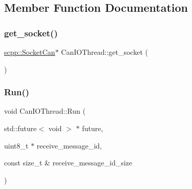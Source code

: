 \subsection{Member Function Documentation}
\mbox{\label{classCanIOThread_abd81d2bfe629d2abf8a3ee4e0d71c7e5}} 
\subsubsection{\texorpdfstring{get\+\_\+socket()}{get\_socket()}}
{\footnotesize\ttfamily \hyperlink{classscpp_1_1SocketCan}{scpp\+::\+Socket\+Can}$\ast$ Can\+I\+O\+Thread\+::get\+\_\+socket (\begin{DoxyParamCaption}{ }\end{DoxyParamCaption})}

\mbox{\label{classCanIOThread_a1dfe981584e3e558df59211571ac9860}} 
\subsubsection{\texorpdfstring{Run()}{Run()}}
{\footnotesize\ttfamily void Can\+I\+O\+Thread\+::\+Run (\begin{DoxyParamCaption}\item[{std\+::future$<$ void $>$ $\ast$}]{future,  }\item[{uint8\+\_\+t $\ast$}]{receive\+\_\+message\+\_\+id,  }\item[{const size\+\_\+t \&}]{receive\+\_\+message\+\_\+id\+\_\+size }\end{DoxyParamCaption})\hspace{0.3cm}{\ttfamily [private]}}

